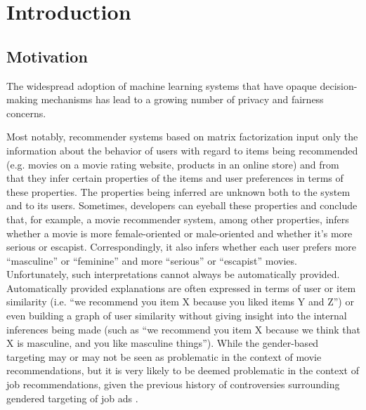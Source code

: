 \chapter{Introduction}




\section{Motivation}


The widespread adoption of machine learning systems that have opaque
decision-making mechanisms has lead to a growing number of privacy and fairness
concerns.


Most notably, recommender systems based on matrix factorization
input only the information about the behavior of users with regard to items
being recommended (e.g. movies on a movie rating website, products in an
online store) and from that they infer certain properties of the items and
user preferences in terms of these properties\cite{facebook-cf}. The properties
being inferred are unknown both to the system and to its users. Sometimes,
developers can eyeball these properties and conclude that, for example, a movie
recommender system, among other properties, infers whether a movie is more
female-oriented or male-oriented and whether it's more serious or escapist.
Correspondingly, it also infers whether each user prefers more ``masculine'' or
``feminine'' and more ``serious'' or ``escapist'' movies\cite{koren2009matrix}.
Unfortunately, such interpretations cannot always be automatically provided.
Automatically provided explanations are often expressed in terms of user or
item similarity (i.e. ``we recommend you item X because you liked items Y and
Z'') or even building a graph of user similarity\cite{hernando2013trees}
without giving insight into the internal inferences being made (such as
``we recommend you item X because we think that X is masculine, and you like
masculine things''). While the gender-based targeting may or may not be seen as
problematic in the context of movie recommendations,  but it is very likely to be
deemed problematic in the context of job recommendations, given the previous
history of controversies surrounding gendered targeting of job ads
\cite{datta_tschantz_datta_2015}.

